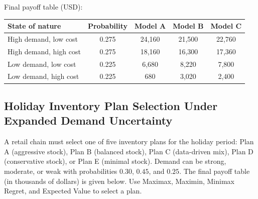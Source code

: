 \begin{ExamProblems}
\begin{center}
		\end{center}
		
		Final payoff table (USD):
		\begin{center}
			\begin{tabular}{l c c c c}
				\toprule
				State of nature & Probability & Model A & Model B & Model C \\
				\midrule
				High demand, low cost & 0.275 & 24{,}160 & 21{,}500 & 22{,}760 \\
				High demand, high cost & 0.275 & 18{,}160 & 16{,}300 & 17{,}360 \\
				Low demand, low cost & 0.225 & 6{,}680 & 8{,}220 & 7{,}800 \\
				Low demand, high cost & 0.225 & 680 & 3{,}020 & 2{,}400 \\
				\bottomrule
			\end{tabular}
		\end{center}
		
		\item
		\subsection*{Holiday Inventory Plan Selection Under Expanded Demand Uncertainty}
		A retail chain must select one of five inventory plans for the holiday period: Plan A (aggressive stock),
		Plan B (balanced stock), Plan C (data-driven mix), Plan D (conservative stock), or Plan E (minimal stock).
		Demand can be strong, moderate, or weak with probabilities $0.30$, $0.45$, and $0.25$.
		The final payoff table (in thousands of dollars) is given below. Use Maximax, Maximin, Minimax Regret,
		and Expected Value to select a plan.
		

\end{ExamProblems}
